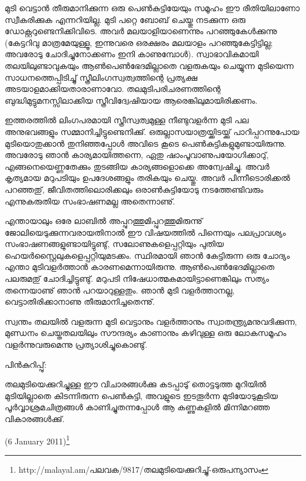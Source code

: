 മുടി വെട്ടാന്‍ തീരുമാനിക്കുന്ന ഒരു പെണ്‍കുട്ടിയേയും സമൂഹം ഈ രീതിയിലാണോ സ്വീകരിക്കുക എന്നറിയില്ല. മുടി പറ്റെ 
ബോബ് ചെയ്തു നടക്കുന്ന ഒരു ഡോക്റ്ററുണ്ടെനിക്കിവിടെ. അവര്‍ മലയാളിയാണെന്നും പറഞ്ഞുകേള്‍ക്കുന്നു (കേട്ടറിവു മാത്രമേയുള്ളൂ, 
ഇന്നുവരെ ഒരക്ഷരം മലയാളം പറഞ്ഞുകേട്ടിട്ടില്ല; അവരോടു ചോദിച്ചുനോക്കണം ഇനി കാണുമ്പോള്‍). സ്വാഭാവികമായി 
തലയിലുണ്ടാവുകയും ആണ്‍പെണ്‍ഭേദമില്ലാതെ വളരുകയും ചെയ്യുന്ന മുടിയെന്ന സാധനത്തെപ്പിടിച്ചു് 
സ്ത്രീലിംഗസ്വത്വത്തിന്റെ പ്രത്യക്ഷ അടയാളമാക്കിയതാരാണാവോ. തലമുടിപരിചരണത്തിന്റെ ബുദ്ധിമുട്ടുമനസ്സിലാക്കിയ സ്ത്രീവിദ്വേഷിയായ ആരെങ്കിലുമായിരിക്കണം.

ഇത്തരത്തില്‍ ലിംഗപരമായി സ്ത്രീസ്വത്വമുള്ള നീണ്ടുവളര്‍ന്ന മുടി പല അനുഭവങ്ങളും സമ്മാനിച്ചിട്ടുണ്ടെനിക്കു്. 
ഒരുല്ലാസയാത്രയ്ക്കിടയ്ക്കു് പാറിപ്പറന്നുപോയ മുടിയൊതുക്കാന്‍ തുനിഞ്ഞപ്പോള്‍ അവിടെ കൂടെ 
പെണ്‍കുട്ടികളുമുണ്ടായിരുന്നു. അവരോടു ഞാന്‍ കാര്യമായിത്തന്നെ, ഏതു ഷാംപൂവാണുപയോഗിക്കാറു്, എങ്ങനെയെണ്ണതേക്കും 
തുടങ്ങിയ കാര്യങ്ങളൊക്കെ അന്വേഷിച്ചു. അവര്‍ കൃത്യമായ മറുപടിയും ഉപദേശങ്ങളും തരികയും ചെയ്തു. അവര്‍ പിന്നീടൊരിക്കല്‍ പറഞ്ഞതു്, 
ജീവിതത്തിലൊരിക്കലും ഒരാണ്‍കുട്ടിയോടു നടത്തേണ്ടിവരും എന്നുകരുതിയ സംഭാഷണമല്ല അതെന്നാണു്.

എന്തായാലും ഒരേ ലാബില്‍ അപ്പുറത്തുമിപ്പുറത്തുമിരുന്നു് ജോലിയെടുക്കുന്നവരായതിനാല്‍ ഈ വിഷയത്തില്‍ പിന്നെയും 
പലപ്രാവശ്യം സംഭാഷണങ്ങളുണ്ടായിട്ടുണ്ടു്, സലോണുകളെപ്പറ്റിയും പുതിയ ഹെയര്‍സ്റ്റൈലുകളെപ്പറ്റിയുമടക്കം. 
സ്ഥിരമായി ഞാന്‍ കേട്ടിരുന്ന ഒരു ചോദ്യം എന്താ മുടിവളര്‍ത്താന്‍ കാരണമെന്നായിരുന്നു. ആണ്‍പെണ്‍ഭേദമില്ലാതെ 
പലരുമതു് ചോദിച്ചിട്ടുണ്ടു്. മറുപടി നിഷേധാത്മകമായിട്ടാണെങ്കിലും സത്യം തന്നെയാണു് ഞാന്‍ പറയാറുള്ളതും. ഞാന്‍ മുടി 
വളര്‍ത്താനല്ല, വെട്ടാതിരിക്കാനാണു തീരുമാനിച്ചതെന്നു്.

സ്വന്തം തലയില്‍ വളരുന്ന മുടി വെട്ടാനും വളര്‍ത്താനും സ്വാതന്ത്ര്യമനുവദിക്കുന്ന, മുണ്ഡനം ചെയ്തതലയിലും 
സൗന്ദര്യം കാണാനും കഴിവുള്ള ഒരു ലോകസമൂഹം വളര്‍ന്നുവരുമെന്നു പ്രത്യാശിച്ചുകൊണ്ടു്.

പിന്‍കുറിപ്പു്:

തലമുടിയെക്കുറിച്ചുള്ള ഈ വിചാരങ്ങള്‍ക്കു കടപ്പാടു് തൊട്ടടുത്ത മുറിയില്‍ മുടിയില്ലാതെ കിടന്നിരുന്ന പെണ്‍കുട്ടി, അവളുടെ ഇടതൂര്‍ന്ന മുടിയോടുകൂടിയ പൂര്‍വ്വാശ്രമചിത്രങ്ങള്‍ കാണിച്ചുതന്നപ്പോള്‍ ആ കണ്ണുകളില്‍ മിന്നിമറഞ്ഞ വികാരങ്ങള്‍ക്കു്.

(6 January 2011)\footnote{http://malayal.am/പലവക/9817/തലമുടിയെക്കുറിച്ചു്-ഒരുപന്യാസം}

\newpage
